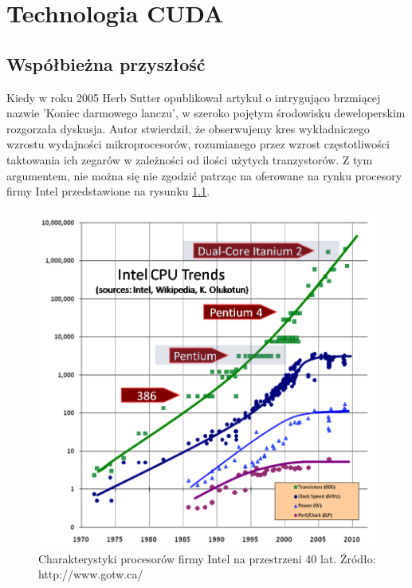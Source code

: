 \chapter{Technologia CUDA}
\section{Współbieżna przyszłość}
Kiedy w roku 2005 Herb Sutter \cite{lunch} opublikował artykuł o intrygująco 
brzmiącej nazwie 'Koniec darmowego lanczu', w szeroko pojętym środowisku 
deweloperskim rozgorzała dyskusja. Autor stwierdził, że obserwujemy kres 
wykładniczego wzrostu wydajności mikroprocesorów, rozumianego przez wzrost 
częstotliwości taktowania ich zegarów w zależności od ilości użytych
tranzystorów. Z tym argumentem, nie można się nie zgodzić patrząc na
oferowane na rynku procesory firmy Intel przedstawione na rysunku \ref{proce}.

\begin{figure}[ht]
\centering
\includegraphics[scale=1.0]{images/CPU.png}
\caption{Charakterystyki procesorów firmy Intel na przestrzeni 40 lat. Źródło: http://www.gotw.ca/}
\label{proce}
\end{figure}

